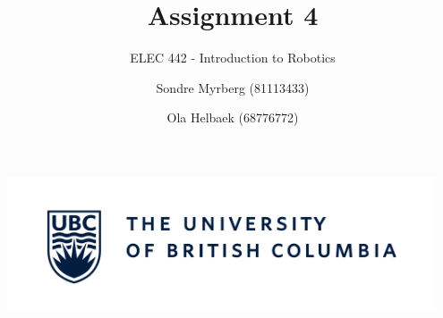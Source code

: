 \documentclass[a4paper]{scrartcl}
\title{Assignment 4}
\subtitle{ELEC 442 - Introduction to Robotics}
\author{Sondre Myrberg (81113433) \and Ola Helbaek (68776772)}
\begin{document}
\hypersetup{pageanchor=false}
\begin{titlepage}
    \maketitle
    \vfill
    \vfill
    \vfill
    \vfill
    \includegraphics[width=0.95\textwidth]{../../ubc_logo.pdf}
    \vfill
    \vfill
\end{titlepage}
\hypersetup{pageanchor=true}
\end{document}
